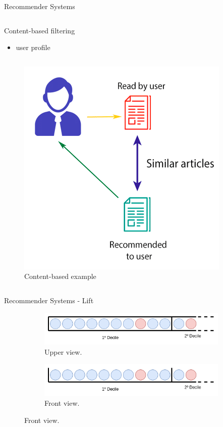\begin{frame}{Recommender Systems}
    \begin{column}{.4\linewidth}
        Content-based filtering \pause
        \begin{itemize}
            \item user profile \pause
        \end{itemize}
    \end{column}
    \begin{column}{.6\linewidth}
        \begin{figure}
           \centering
           \caption{Content-based example}
           \includegraphics[width=.65\linewidth]{fig/content-based-example.png}
        \end{figure}
    \end{column}
\end{frame}


\begin{frame}{Recommender Systems - Lift} \pause
    \begin{figure}
        \caption{Rectangular box with colored balls.} \pause
        \begin{subfigure}{\linewidth}
            \centering
            \includegraphics[width=\linewidth]{fig/ch2-rec-box-upper.png}
            \caption{Upper view.}
        \end{subfigure}
        \begin{subfigure}{\linewidth}
            \centering
            \includegraphics[width=\linewidth]{fig/ch2-rec-box-front.png}
            \caption{Front view.}
        \end{subfigure}
    \end{figure}
\end{frame}

